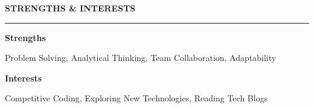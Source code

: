 \documentclass[a4paper]{article}
\newcommand{\sidehead}[1]{%
    {\color{navy}\bfseries\normalsize #1}\par
    \vspace{2pt}%
    {\color{navy}\rule{\linewidth}{0.65pt}}%
    \vspace{4pt}\par
}
\begin{document}
\begin{minipage}[t]{75mm}
\begin{minipage}[t]{60mm}
        \vspace{8pt}

        \sidehead{STRENGTHS \& INTERESTS}

        {\small\textbf{Strengths}}\par
        {\small Problem Solving, Analytical Thinking, Team Collaboration, Adaptability}\par
        \vspace{3pt}
        {\small\textbf{Interests}}\par
        {\small Competitive Coding, Exploring New Technologies, Reading Tech Blogs}\par

    \end{minipage}

\end{minipage}%
\end{document}
